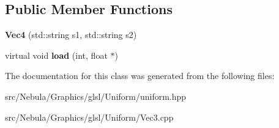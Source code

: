 \subsection*{\-Public \-Member \-Functions}
\begin{DoxyCompactItemize}
\item 
\hypertarget{classNeb_1_1glsl_1_1Uniform_1_1Vector_1_1Vec4_a507acc5ac257f999383cfa4a8622a34c}{{\bfseries \-Vec4} (std\-::string s1, std\-::string s2)}\label{classNeb_1_1glsl_1_1Uniform_1_1Vector_1_1Vec4_a507acc5ac257f999383cfa4a8622a34c}

\item 
\hypertarget{classNeb_1_1glsl_1_1Uniform_1_1Vector_1_1Vec4_af60145d1b7c2891fd72fe30b1d45f2b5}{virtual void {\bfseries load} (int, float $\ast$)}\label{classNeb_1_1glsl_1_1Uniform_1_1Vector_1_1Vec4_af60145d1b7c2891fd72fe30b1d45f2b5}

\end{DoxyCompactItemize}


\-The documentation for this class was generated from the following files\-:\begin{DoxyCompactItemize}
\item 
src/\-Nebula/\-Graphics/glsl/\-Uniform/uniform.\-hpp\item 
src/\-Nebula/\-Graphics/glsl/\-Uniform/\-Vec3.\-cpp\end{DoxyCompactItemize}
